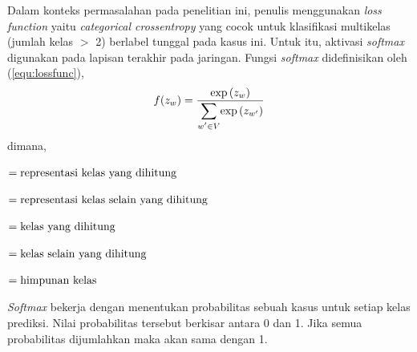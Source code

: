 Dalam konteks permasalahan pada penelitian ini, penulis menggunakan \textit{loss function} yaitu \textit{categorical crossentropy} yang cocok untuk klasifikasi multikelas (jumlah kelas $>$ 2) berlabel tunggal pada kasus ini. Untuk itu, aktivasi \textit{softmax}  digunakan pada lapisan terakhir pada jaringan. Fungsi \textit{softmax} didefinisikan oleh (\ref{equ:lossfunc}),
\begin{equation}
    f(z_w) = \frac{\exp{(z_w)}}{\mathlarger{\sum}\limits_{w' \in V}{\exp{(z_{w'})}}}
    \label{equ:lossfunc}
\end{equation}
dimana,
\begin{description}[align=parleft,labelwidth=1cm]
    \item[$z_w$] $= \parbox[t]{10.9cm}{representasi kelas yang dihitung}$
    \item[$z_w'$] $= \parbox[t]{10.9cm}{representasi kelas selain yang dihitung}$
    \item[$w$] $= \parbox[t]{10.9cm}{kelas yang dihitung}$
    \item[$w'$] $= \parbox[t]{10.9cm}{kelas selain yang dihitung}$
    \item[$V$] $= \parbox[t]{10.9cm}{himpunan kelas}$
\end{description}
\textit{Softmax} bekerja dengan menentukan probabilitas sebuah kasus untuk setiap kelas prediksi. Nilai probabilitas tersebut berkisar antara 0 dan 1. Jika semua probabilitas dijumlahkan maka akan sama dengan 1.

